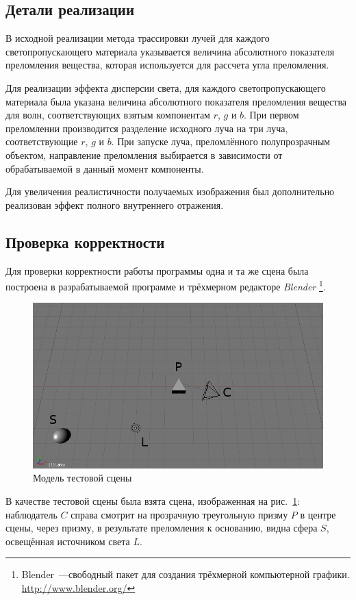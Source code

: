 \documentclass[a4paper,10pt]{article}
\begin{document}
\subsection{Детали реализации}
В исходной реализации метода трассировки лучей для каждого светопропускающего материала указывается 
величина абсолютного показателя преломления вещества, которая используется для рассчета угла преломления.

Для реализации эффекта дисперсии света, 
для каждого светопропускающего материала была указана величина абсолютного показателя преломления вещества для волн,
соответствующих взятым компонентам $r$, $g$ и $b$.
При первом преломлении производится разделение исходного луча на три луча, соответствующие $r$, $g$ и $b$.
При запуске луча, преломлённого полупрозрачным объектом, 
направление преломления выбирается в зависимости от обрабатываемой в данный момент компоненты.

Для увеличения реалистичности получаемых изображения был дополнительно реализован 
эффект полного внутреннего отражения.

\subsection{Проверка корректности}
Для проверки корректности работы программы одна и та же сцена была построена в разрабатываемой программе и
трёхмерном редакторе \textit{Blender}%
\footnote{Blender~---свободный пакет для создания трёхмерной компьютерной графики. \url{http://www.blender.org/}}.
\begin{figure}[h!]
  \centering
  \includegraphics[width=0.8\linewidth]{./screenshots/prism_test_model.png}
  \caption{Модель тестовой сцены}
  \label{fig:prism-test-model}
\end{figure}
В качестве тестовой сцены была взята сцена, изображенная на рис.~\ref{fig:prism-test-model}: 
наблюдатель $C$ справа смотрит на прозрачную треугольную призму $P$ в центре сцены,
через призму, в результате преломления к основанию, видна сфера $S$, освещённая источником света $L$.
\end{document}
